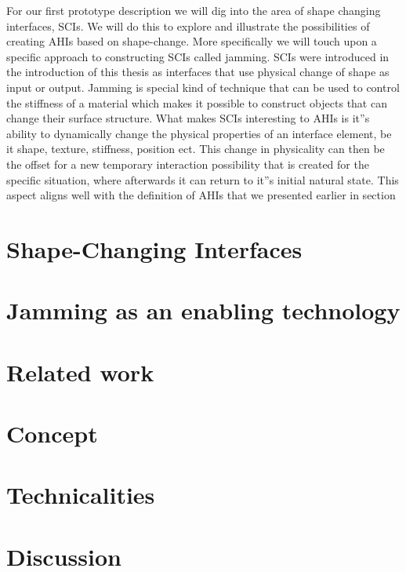 For our first prototype description we will dig into the area of shape changing interfaces, SCIs.
We will do this to explore and illustrate the possibilities of creating AHIs based on shape-change.
More specifically we will touch upon a specific approach to constructing SCIs called jamming.
SCIs were introduced in the introduction of this thesis as interfaces that use physical change of shape as input or output.
Jamming is special kind of technique that can be used to control the stiffness of a material which makes it possible to construct objects that can change their surface structure.
What makes SCIs interesting to AHIs is it''s ability to dynamically change the physical properties of an interface element, be it shape, texture, stiffness, position ect.
This change in physicality can then be the offset for a new temporary interaction possibility that is created for the specific situation, where afterwards it can return to it''s initial natural state.
This aspect aligns well with the definition of AHIs that we presented earlier in section  

\section{Shape-Changing Interfaces}
\label{ch:jamming:shape-change} 

\section{Jamming as an enabling technology}
\label{ch:jamming:enabling-technology} 


\section{Related work}
\label{ch:jamming:related-work} 


\section{Concept}

\section{Technicalities}
\section{Discussion}
